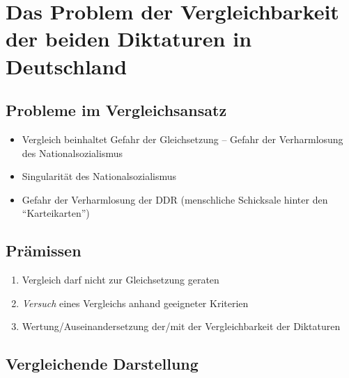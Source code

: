 \section{Das Problem der Vergleichbarkeit der beiden Diktaturen in
Deutschland}



\subsection*{Probleme im Vergleichsansatz}

\begin{itemize}
\item Vergleich beinhaltet Gefahr der Gleichsetzung -- Gefahr der
Verharmlosung des Nationalsozialismus

\item Singularität des Nationalsozialismus

\item Gefahr der Verharmlosung der DDR (menschliche Schicksale hinter
den \enquote{Karteikarten}) 
\end{itemize}


\subsection*{Prämissen}

\begin{enumerate}
\item Vergleich darf nicht zur Gleichsetzung geraten
\item \emph{Versuch} eines Vergleichs anhand geeigneter Kriterien
\item Wertung/Auseinandersetzung der/mit der Vergleichbarkeit der
Diktaturen
\end{enumerate}


\subsection*{Vergleichende Darstellung}


